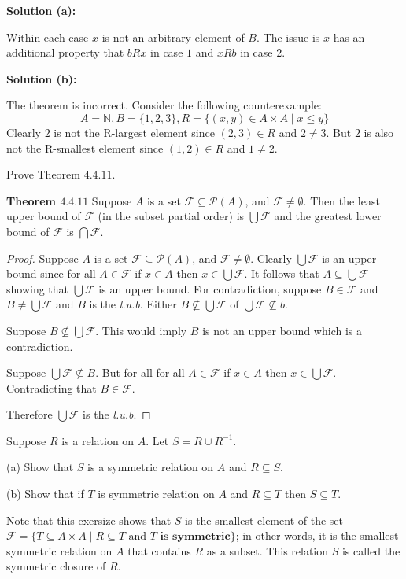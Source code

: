 \textbf{Solution (a):}

Within each case $x$ is not an arbitrary element of $B$.
The issue is $x$ has an additional property that $bRx$ in case $1$
and $xRb$ in case $2$.

\textbf{Solution (b):}

The theorem is incorrect. Consider the following counterexample:
\[A = \mathbb{N}, B = \{1, 2, 3\}, R = \{(x, y) \in A \times A \mid x \le y\}\]
Clearly $2$ is not the R-largest element since $(2, 3) \in R$ and $2 \not= 3$.
But $2$ is also not the R-smallest element since $(1, 2) \in R$ and $1 \not= 2$.

\begin{tcolorbox}[title=Problem 23, breakable]
    Prove Theorem $4.4.11$.

    \textbf{Theorem $4.4.11$} Suppose $A$ is a set $\mathcal{F} \subseteq \mathcal{P}(A)$,
    and $\mathcal{F} \not= \emptyset$. Then the least upper 
    bound of $\mathcal{F}$ (in the subset partial order) is $\bigcup\mathcal{F}$
    and the greatest lower bound of $\mathcal{F}$ is $\bigcap\mathcal{F}$.
\end{tcolorbox}

\begin{proof}
    Suppose $A$ is a set $\mathcal{F}\subseteq\mathcal{P}(A)$, and $\mathcal{F} \not= \emptyset$.
    Clearly $\bigcup\mathcal{F}$ is an upper bound 
        since for all $A \in \mathcal{F}$ if $x \in A$ then  $x \in \bigcup \mathcal{F}$.
    It follows that $A \subseteq \bigcup \mathcal{F}$ showing that $\bigcup \mathcal{F}$ is an upper bound.
    For contradiction, suppose $B \in \mathcal{F}$ and 
        $B \not= \bigcup \mathcal{F}$ and $B$ is the \emph{l.u.b}.
    Either $B \not \subseteq \bigcup \mathcal{F}$ of $\bigcup \mathcal{F} \not \subseteq b$.

    Suppose $B \not \subseteq \bigcup \mathcal{F}$. This would imply $B$ is not an upper 
    bound which is a contradiction.

    Suppose $\bigcup \mathcal{F} \not \subseteq B$. But for all 
        for all $A \in \mathcal{F}$ if $x \in A$ then  $x \in \bigcup \mathcal{F}$.
    Contradicting that $B \in \mathcal{F}$.

    Therefore $\bigcup \mathcal{F}$ is the \emph{l.u.b}.
\end{proof}

\begin{tcolorbox}[title=Problem 24, breakable]
    Suppose $R$ is a relation on $A$. Let $S = R \cup R^{-1}$.

    (a) Show that $S$ is a symmetric relation on $A$ and $R \subseteq S$.

    (b) Show that if $T$ is symmetric relation on $A$ and $R \subseteq T$
        then $S \subseteq T$.

    Note that this exersize shows that $S$ is the smallest element of the set 
    $\mathcal{F} = \{T \subseteq A \times A \mid R \subseteq T \text{ and } T \textbf{ is symmetric}\}$;
    in other words, it is the smallest symmetric relation on $A$ that contains $R$ as a subset. This 
    relation $S$ is called the symmetric closure of $R$.
\end{tcolorbox}

